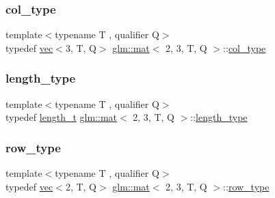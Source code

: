 \subsubsection{\texorpdfstring{col\+\_\+type}{col\_type}}
{\footnotesize\ttfamily template$<$typename T , qualifier Q$>$ \\
typedef \mbox{\hyperlink{structglm_1_1vec}{vec}}$<$3, T, Q$>$ \mbox{\hyperlink{structglm_1_1mat}{glm\+::mat}}$<$ 2, 3, T, Q $>$\+::\mbox{\hyperlink{structglm_1_1mat_3_012_00_013_00_01_t_00_01_q_01_4_aebe4faf14ea1bc3092b4bbf591d7194e}{col\+\_\+type}}}

\mbox{\label{structglm_1_1mat_3_012_00_013_00_01_t_00_01_q_01_4_ad2e2433ba375abcd6bada873f8ea2de1}} 
\subsubsection{\texorpdfstring{length\+\_\+type}{length\_type}}
{\footnotesize\ttfamily template$<$typename T , qualifier Q$>$ \\
typedef \mbox{\hyperlink{namespaceglm_a090a0de2260835bee80e71a702492ed9}{length\+\_\+t}} \mbox{\hyperlink{structglm_1_1mat}{glm\+::mat}}$<$ 2, 3, T, Q $>$\+::\mbox{\hyperlink{structglm_1_1mat_3_012_00_013_00_01_t_00_01_q_01_4_ad2e2433ba375abcd6bada873f8ea2de1}{length\+\_\+type}}}

\mbox{\label{structglm_1_1mat_3_012_00_013_00_01_t_00_01_q_01_4_a94cb8478500cfb7249eadf766b9e64f1}} 
\subsubsection{\texorpdfstring{row\+\_\+type}{row\_type}}
{\footnotesize\ttfamily template$<$typename T , qualifier Q$>$ \\
typedef \mbox{\hyperlink{structglm_1_1vec}{vec}}$<$2, T, Q$>$ \mbox{\hyperlink{structglm_1_1mat}{glm\+::mat}}$<$ 2, 3, T, Q $>$\+::\mbox{\hyperlink{structglm_1_1mat_3_012_00_013_00_01_t_00_01_q_01_4_a94cb8478500cfb7249eadf766b9e64f1}{row\+\_\+type}}}

